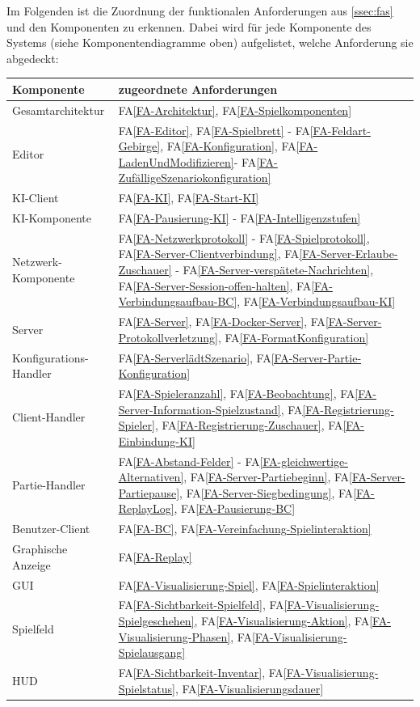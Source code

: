 \documentclass[12pt]{article}
\newcounter{fa}
\newcounter{nfa}
\newcommand{\mfaref}[1]{FA\ref{#1}}
\begin{document}
Im Folgenden ist die Zuordnung der funktionalen Anforderungen aus \autoref{ssec:fas} und den Komponenten zu erkennen. Dabei wird für jede Komponente des Systems (siehe Komponentendiagramme oben) aufgelistet, welche Anforderung sie abgedeckt: \\ 
\begin{tabularx}{\linewidth}{l|X}
	\textbf{Komponente} & \textbf{zugeordnete Anforderungen} \\
	\hline
	Gesamtarchitektur & \mfaref{FA-Architektur}, \mfaref{FA-Spielkomponenten}\\
	Editor & \mfaref{FA-Editor}, \mfaref{FA-Spielbrett} - \mfaref{FA-Feldart-Gebirge}, \mfaref{FA-Konfiguration}, \mfaref{FA-LadenUndModifizieren}- \mfaref{FA-ZufälligeSzenariokonfiguration}\\
	KI-Client & \mfaref{FA-KI}, \mfaref{FA-Start-KI}\\
	KI-Komponente & \mfaref{FA-Pausierung-KI} - \mfaref{FA-Intelligenzstufen}\\
	Netzwerk-Komponente & \mfaref{FA-Netzwerkprotokoll} - \mfaref{FA-Spielprotokoll}, \mfaref{FA-Server-Clientverbindung}, \mfaref{FA-Server-Erlaube-Zuschauer} - \mfaref{FA-Server-verspätete-Nachrichten}, \mfaref{FA-Server-Session-offen-halten}, \mfaref{FA-Verbindungsaufbau-BC}, \mfaref{FA-Verbindungsaufbau-KI}\\
	Server & \mfaref{FA-Server}, \mfaref{FA-Docker-Server}, \mfaref{FA-Server-Protokollverletzung}, \mfaref{FA-FormatKonfiguration}\\
	Konfigurations-Handler & \mfaref{FA-ServerlädtSzenario}, \mfaref{FA-Server-Partie-Konfiguration}\\
	Client-Handler & \mfaref{FA-Spieleranzahl}, \mfaref{FA-Beobachtung}, \mfaref{FA-Server-Information-Spielzustand}, \mfaref{FA-Registrierung-Spieler}, \mfaref{FA-Registrierung-Zuschauer}, \mfaref{FA-Einbindung-KI}\\
	Partie-Handler & \mfaref{FA-Abstand-Felder} - \mfaref{FA-gleichwertige-Alternativen}, \mfaref{FA-Server-Partiebeginn}, \mfaref{FA-Server-Partiepause}, \mfaref{FA-Server-Siegbedingung}, \mfaref{FA-ReplayLog}, \mfaref{FA-Pausierung-BC}\\
	Benutzer-Client & \mfaref{FA-BC}, \mfaref{FA-Vereinfachung-Spielinteraktion}\\
	Graphische Anzeige & \mfaref{FA-Replay}\\
	GUI & \mfaref{FA-Visualisierung-Spiel}, \mfaref{FA-Spielinteraktion}\\
	Spielfeld & \mfaref{FA-Sichtbarkeit-Spielfeld}, \mfaref{FA-Visualisierung-Spielgeschehen}, \mfaref{FA-Visualisierung-Aktion}, \mfaref{FA-Visualisierung-Phasen}, \mfaref{FA-Visualisierung-Spielausgang}\\
	HUD & \mfaref{FA-Sichtbarkeit-Inventar}, \mfaref{FA-Visualisierung-Spielstatus}, \mfaref{FA-Visualisierungsdauer}\\
\end{tabularx}
\end{document}

